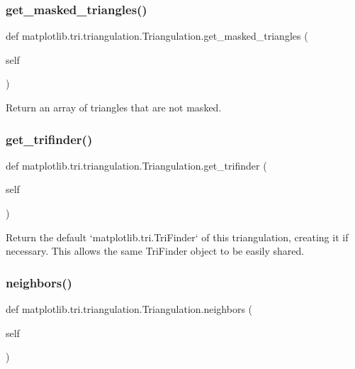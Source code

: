 \subsubsection{\texorpdfstring{get\+\_\+masked\+\_\+triangles()}{get\_masked\_triangles()}}
{\footnotesize\ttfamily def matplotlib.\+tri.\+triangulation.\+Triangulation.\+get\+\_\+masked\+\_\+triangles (\begin{DoxyParamCaption}\item[{}]{self }\end{DoxyParamCaption})}

\begin{DoxyVerb}Return an array of triangles that are not masked.
\end{DoxyVerb}
 \mbox{\label{classmatplotlib_1_1tri_1_1triangulation_1_1Triangulation_a7cb84eddc0dc9d31717bfc653b34b3ec}} 
\subsubsection{\texorpdfstring{get\+\_\+trifinder()}{get\_trifinder()}}
{\footnotesize\ttfamily def matplotlib.\+tri.\+triangulation.\+Triangulation.\+get\+\_\+trifinder (\begin{DoxyParamCaption}\item[{}]{self }\end{DoxyParamCaption})}

\begin{DoxyVerb}Return the default `matplotlib.tri.TriFinder` of this
triangulation, creating it if necessary.  This allows the same
TriFinder object to be easily shared.
\end{DoxyVerb}
 \mbox{\label{classmatplotlib_1_1tri_1_1triangulation_1_1Triangulation_a01e22c19d230faee534109d3d372f862}} 
\subsubsection{\texorpdfstring{neighbors()}{neighbors()}}
{\footnotesize\ttfamily def matplotlib.\+tri.\+triangulation.\+Triangulation.\+neighbors (\begin{DoxyParamCaption}\item[{}]{self }\end{DoxyParamCaption})}

